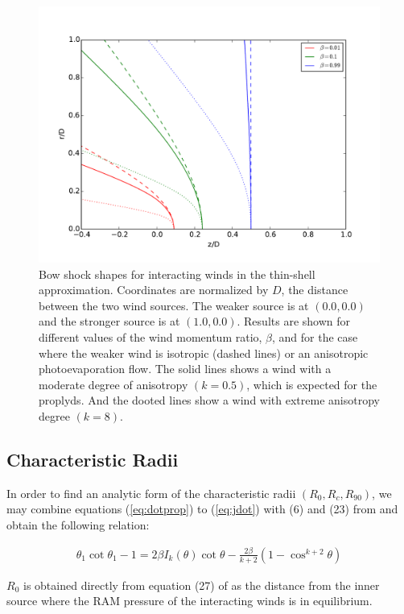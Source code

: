 \begin{figure}
\includegraphics[width=\linewidth]{r-beta}
\caption{Bow shock shapes for interacting winds in the thin-shell
  approximation. Coordinates are normalized by $D$, the distance
  between the two wind sources.  The weaker source is at \((0.0, 0.0)\)
  and the stronger source is at \((1.0, 0.0)\).  Results are shown for
  different values of the wind momentum ratio, \(\beta\), and for the
  case where the weaker wind is isotropic (dashed lines) or an
  anisotropic photoevaporation flow. The solid lines shows a wind with a
  moderate degree of anisotropy $(k=0.5)$, which is expected for the proplyds.
  And the dooted lines show a wind with extreme anisotropy degree $(k=8)$.}
\label{fig:r-beta}
\end{figure}

\subsection{Characteristic Radii}

In order to find an analytic form of the characteristic radii $(R_0,R_c,R_{90})$, we may combine equations (\ref{eq:dotprop}) to (\ref{eq:jdot}) with (6) and (23) from \CRW{}
and obtain the following relation:


\begin{align}
\theta_1\cot\theta_1 -1 = 2\beta I_k(\theta) \cot\theta - \frac{2\beta}{k+2}\left(1-\cos^{k+2}\theta\right)
\label{eq:th1th}
\end{align}

$R_0$ is obtained directly from equation (27) of \CRW{} as the distance from the inner source where the RAM pressure of the interacting winds is in equilibrium.

